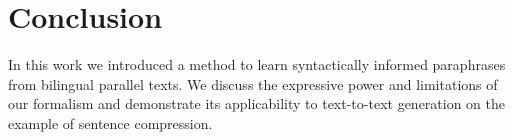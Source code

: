 \documentclass[11pt]{article}
\begin{document}
\section{Conclusion} \label{conclusion}

In this work we introduced a method to learn syntactically informed
paraphrases from bilingual parallel texts. We discuss the expressive
power and limitations of our formalism and demonstrate its
applicability to text-to-text generation on the example of sentence
compression.




\end{document}

